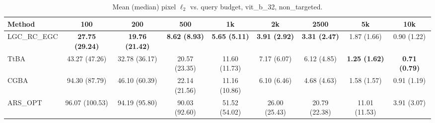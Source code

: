 \begin{table}[t]
\centering\footnotesize
\caption{Mean (median) pixel $\ell_2$ vs. query budget, vit\_b\_32, non\_targeted.}
\begin{tabular}{lcccccccc}
\toprule
Method & 100 & 200 & 500 & 1k & 2k & 2500 & 5k & 10k \\
\midrule
LGC\_RC\_EGC & \textbf{27.75 (29.24)} & \textbf{19.76 (21.42)} & \textbf{8.62 (8.93)} & \textbf{5.65 (5.11)} & \textbf{3.91 (2.92)} & \textbf{3.31 (2.47)} & 1.87 (1.66) & 0.90 (1.22) \\
TtBA & 43.27 (47.26) & 32.78 (36.17) & 20.57 (23.35) & 11.60 (11.73) & 7.17 (6.07) & 6.12 (4.85) & \textbf{1.25 (1.62)} & \textbf{0.71 (0.79)} \\
CGBA & 94.30 (87.79) & 46.10 (60.39) & 22.14 (21.56) & 11.16 (10.86) & 6.10 (6.46) & 4.68 (4.63) & 1.58 (1.57) & 0.91 (1.19) \\
ARS\_OPT & 96.07 (100.53) & 94.19 (95.80) & 90.03 (92.60) & 51.52 (54.02) & 26.00 (25.43) & 20.79 (22.38) & 11.01 (11.53) & 3.91 (3.07) \\
\bottomrule
\end{tabular}
\end{table}
